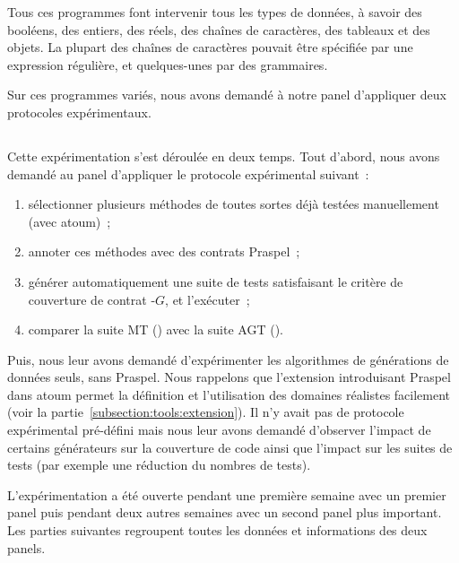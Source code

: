 Tous ces programmes font intervenir tous les types de données, à savoir des
booléens, des entiers, des réels, des chaînes de caractères, des tableaux et des
objets. La plupart des chaînes de caractères pouvait être spécifiée par une
expression régulière, et quelques-unes par des grammaires.

Sur ces programmes variés, nous avons demandé à notre panel d'appliquer deux
protocoles expérimentaux.

\subsection{}
\label{subsection:experimentation:modus_operandi}

Cette expérimentation s'est déroulée en deux temps. Tout d'abord, nous avons
demandé au panel d'appliquer le protocole expérimental suivant~:
%
\begin{enumerate}

\item sélectionner plusieurs méthodes de toutes sortes déjà testées
manuellement (avec atoum)~;

\item annoter ces méthodes avec des contrats Praspel~;

\item générer automatiquement une suite de tests satisfaisant le critère de
couverture de contrat -$G$, et l'exécuter~;

\item comparer la suite MT () avec la suite AGT
().

\end{enumerate}

Puis, nous leur avons demandé d'expérimenter les algorithmes de générations de
données seuls, sans Praspel. Nous rappelons que l'extension introduisant Praspel
dans atoum permet la définition et l'utilisation des domaines réalistes
facilement (voir la partie~\ref{subsection:tools:extension}). Il n'y avait pas
de protocole expérimental pré-défini mais nous leur avons demandé d'observer
l'impact de certains générateurs sur la couverture de code ainsi que l'impact
sur les suites de tests (par exemple une réduction du nombres de tests).

L'expérimentation a été ouverte pendant une première semaine avec un premier
panel puis pendant deux autres semaines avec un second panel plus important. Les
parties suivantes regroupent toutes les données et informations des deux panels.


